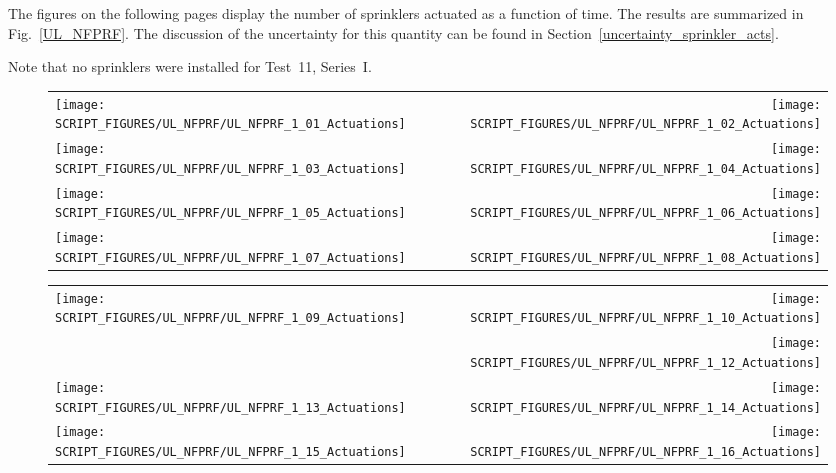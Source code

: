The figures on the following pages display the number of sprinklers actuated as a function of time. The results are summarized in Fig.~\ref{UL_NFPRF}. The discussion of the uncertainty for this quantity can be found in Section~\ref{uncertainty_sprinkler_acts}. 

Note that no sprinklers were installed for Test~11, Series~I.

\newpage

\begin{figure}[p]
\begin{tabular*}{\textwidth}{l@{\extracolsep{\fill}}r}
\texttt{[image: SCRIPT\_FIGURES/UL\_NFPRF/UL\_NFPRF\_1\_01\_Actuations]} &
\texttt{[image: SCRIPT\_FIGURES/UL\_NFPRF/UL\_NFPRF\_1\_02\_Actuations]} \\
\texttt{[image: SCRIPT\_FIGURES/UL\_NFPRF/UL\_NFPRF\_1\_03\_Actuations]} &
\texttt{[image: SCRIPT\_FIGURES/UL\_NFPRF/UL\_NFPRF\_1\_04\_Actuations]} \\
\texttt{[image: SCRIPT\_FIGURES/UL\_NFPRF/UL\_NFPRF\_1\_05\_Actuations]} &
\texttt{[image: SCRIPT\_FIGURES/UL\_NFPRF/UL\_NFPRF\_1\_06\_Actuations]} \\
\texttt{[image: SCRIPT\_FIGURES/UL\_NFPRF/UL\_NFPRF\_1\_07\_Actuations]} &
\texttt{[image: SCRIPT\_FIGURES/UL\_NFPRF/UL\_NFPRF\_1\_08\_Actuations]} \\
\end{tabular*}
\label{UL_NFPRF_1}
\end{figure}

\begin{figure}[p]
\begin{tabular*}{\textwidth}{l@{\extracolsep{\fill}}r}
\texttt{[image: SCRIPT\_FIGURES/UL\_NFPRF/UL\_NFPRF\_1\_09\_Actuations]} &
\texttt{[image: SCRIPT\_FIGURES/UL\_NFPRF/UL\_NFPRF\_1\_10\_Actuations]} \\
&
\texttt{[image: SCRIPT\_FIGURES/UL\_NFPRF/UL\_NFPRF\_1\_12\_Actuations]} \\
\texttt{[image: SCRIPT\_FIGURES/UL\_NFPRF/UL\_NFPRF\_1\_13\_Actuations]} &
\texttt{[image: SCRIPT\_FIGURES/UL\_NFPRF/UL\_NFPRF\_1\_14\_Actuations]} \\
\texttt{[image: SCRIPT\_FIGURES/UL\_NFPRF/UL\_NFPRF\_1\_15\_Actuations]} &
\texttt{[image: SCRIPT\_FIGURES/UL\_NFPRF/UL\_NFPRF\_1\_16\_Actuations]} \\
\end{tabular*}
\label{UL_NFPRF_2}
\end{figure}

